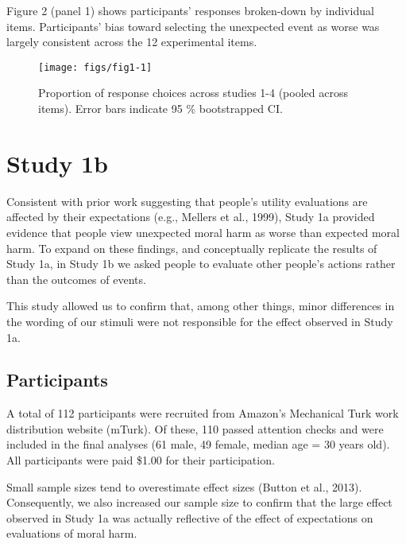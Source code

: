 \documentclass[10pt, letterpaper]{article}
\newenvironment{CodeChunk}{}{}
\begin{document}
Figure 2 (panel 1) shows participants' responses broken-down by
individual items. Participants' bias toward selecting the unexpected
event as worse was largely consistent across the 12 experimental items.

\begin{CodeChunk}
\begin{figure}[H]

{\centering \texttt{[image: figs/fig1-1]} 

}

\caption[Proportion of response choices across studies 1-4 (pooled across items)]{Proportion of response choices across studies 1-4 (pooled across items). Error bars indicate 95 \% bootstrapped CI.}\label{fig:fig1}
\end{figure}
\end{CodeChunk}

\section{Study 1b}\label{study-1b}

Consistent with prior work suggesting that people's utility evaluations
are affected by their expectations (e.g., Mellers et al., 1999), Study
1a provided evidence that people view unexpected moral harm as worse
than expected moral harm. To expand on these findings, and conceptually
replicate the results of Study 1a, in Study 1b we asked people to
evaluate other people's actions rather than the outcomes of events.

This study allowed us to confirm that, among other things, minor
differences in the wording of our stimuli were not responsible for the
effect observed in Study 1a.

\subsection{Participants}\label{participants-1}

A total of 112 participants were recruited from Amazon's Mechanical Turk
work distribution website (mTurk). Of these, 110 passed attention checks
and were included in the final analyses (61 male, 49 female, median age
= 30 years old). All participants were paid \$1.00 for their
participation.

Small sample sizes tend to overestimate effect sizes (Button et al.,
2013). Consequently, we also increased our sample size to confirm that
the large effect observed in Study 1a was actually reflective of the
effect of expectations on evaluations of moral harm.
\end{document}
